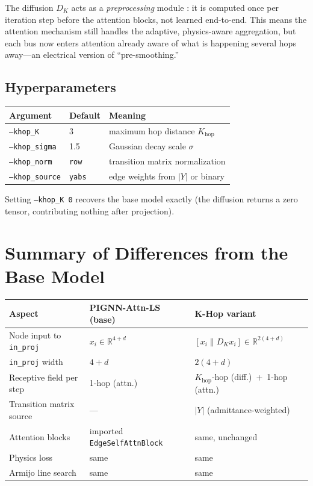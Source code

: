\documentclass{article}
\begin{document}
The diffusion $D_K$ acts as a \emph{preprocessing} module
\cite{zhang2026khg}: it is computed once per iteration step before the
attention blocks, not learned end-to-end.  This means the attention
mechanism still handles the adaptive, physics-aware aggregation, but each
bus now enters attention already aware of what is happening several hops
away---an electrical version of ``pre-smoothing.''

\subsection{Hyperparameters}

\begin{center}
\begin{tabular}{lll}
\toprule
Argument & Default & Meaning \\
\midrule
\texttt{--khop\_K} & 3 & maximum hop distance $K_{\mathrm{hop}}$ \\
\texttt{--khop\_sigma} & 1.5 & Gaussian decay scale $\sigma$ \\
\texttt{--khop\_norm} & \texttt{row} & transition matrix normalization \\
\texttt{--khop\_source} & \texttt{yabs} & edge weights from $|Y|$ or binary \\
\bottomrule
\end{tabular}
\end{center}

Setting \texttt{--khop\_K 0} recovers the base model exactly (the diffusion
returns a zero tensor, contributing nothing after projection).

\section{Summary of Differences from the Base Model}

\begin{center}
\begin{tabular}{lll}
\toprule
Aspect & PIGNN-Attn-LS (base) & K-Hop variant \\
\midrule
Node input to \texttt{in\_proj} & $x_i \in \mathbb{R}^{4+d}$ &
  $[x_i \| D_K x_i] \in \mathbb{R}^{2(4+d)}$ \\
\texttt{in\_proj} width & $4+d$ & $2(4+d)$ \\
Receptive field per step & 1-hop (attn.) &
  $K_{\mathrm{hop}}$-hop (diff.)\ +\ 1-hop (attn.) \\
Transition matrix source & --- & $|Y|$ (admittance-weighted) \\
Attention blocks & imported \texttt{EdgeSelfAttnBlock} &
  same, unchanged \\
Physics loss & same & same \\
Armijo line search & same & same \\
\bottomrule
\end{tabular}
\end{center}
\end{document}
